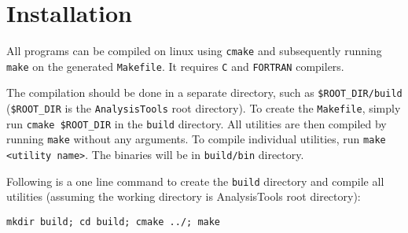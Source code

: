 \chapter{Installation} \label{chap:Install}

All programs can be compiled on linux using \texttt{cmake} and subsequently
running \texttt{make} on the generated \texttt{Makefile}. It requires
\texttt{C} and \texttt{FORTRAN} compilers.

The compilation should be done in a separate directory, such as
\texttt{\$ROOT\_DIR/build} (\texttt{\$ROOT\_DIR} is the
\texttt{AnalysisTools} root directory). To create the \texttt{Makefile},
simply run \texttt{cmake \$ROOT\_DIR} in the \texttt{build} directory.  All
utilities are then compiled by running \texttt{make} without any arguments.
To compile individual utilities, run \texttt{make <utility name>}.  The
binaries will be in \texttt{build/bin} directory.

Following is a one line command to create the \texttt{build} directory and
compile all utilities (assuming the working directory is AnalysisTools root
directory):

\texttt{mkdir build; cd build; cmake ../; make}
